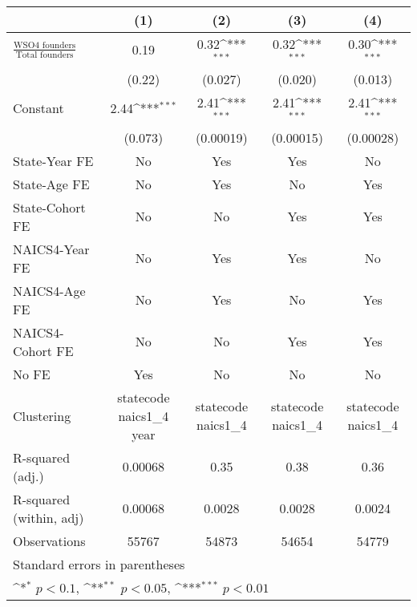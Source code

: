 {
\def\sym#1{\ifmmode^{#1}\else\(^{#1}\)\fi}
\begin{tabular}{l*{4}{c}}
\toprule
                    &\multicolumn{1}{c}{(1)}         &\multicolumn{1}{c}{(2)}         &\multicolumn{1}{c}{(3)}         &\multicolumn{1}{c}{(4)}         \\
\midrule
$\frac{\text{WSO4 founders}}{\text{Total founders}}$&        0.19         &        0.32\sym{***}&        0.32\sym{***}&        0.30\sym{***}\\
                    &      (0.22)         &     (0.027)         &     (0.020)         &     (0.013)         \\
\addlinespace
Constant            &        2.44\sym{***}&        2.41\sym{***}&        2.41\sym{***}&        2.41\sym{***}\\
                    &     (0.073)         &   (0.00019)         &   (0.00015)         &   (0.00028)         \\
\addlinespace
State-Year FE       &          No         &         Yes         &         Yes         &          No         \\
\addlinespace
State-Age FE        &          No         &         Yes         &          No         &         Yes         \\
\addlinespace
State-Cohort FE     &          No         &          No         &         Yes         &         Yes         \\
\addlinespace
NAICS4-Year FE      &          No         &         Yes         &         Yes         &          No         \\
\addlinespace
NAICS4-Age FE       &          No         &         Yes         &          No         &         Yes         \\
\addlinespace
NAICS4-Cohort FE    &          No         &          No         &         Yes         &         Yes         \\
\addlinespace
No FE               &         Yes         &          No         &          No         &          No         \\
\midrule
Clustering          &statecode naics1\_4 year         &statecode naics1\_4         &statecode naics1\_4         &statecode naics1\_4         \\
R-squared (adj.)    &     0.00068         &        0.35         &        0.38         &        0.36         \\
R-squared (within, adj)&     0.00068         &      0.0028         &      0.0028         &      0.0024         \\
Observations        &       55767         &       54873         &       54654         &       54779         \\
\bottomrule
\multicolumn{5}{l}{\footnotesize Standard errors in parentheses}\\
\multicolumn{5}{l}{\footnotesize \sym{*} \(p<0.1\), \sym{**} \(p<0.05\), \sym{***} \(p<0.01\)}\\
\end{tabular}
}
